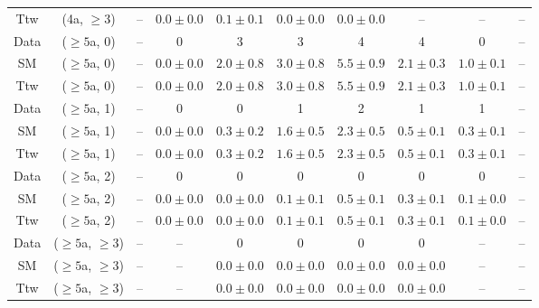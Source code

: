 \begin{table}[h!]
{\begin{tabular}{cccccccccc}
	Ttw & (4a, $\ge3$) & -- & $0.0\pm 0.0$ & $0.1\pm 0.1$ & $0.0\pm 0.0$ & $0.0\pm 0.0$ & -- & -- & -- \\[0.5ex] 
	Data & ($\ge5$a, 0) & -- & 0 & 3 & 3 & 4 & 4 & 0 & -- \\[0.5ex] 
	SM & ($\ge5$a, 0) & -- & $0.0\pm 0.0$ & $2.0\pm 0.8$ & $3.0\pm 0.8$ & $5.5\pm 0.9$ & $2.1\pm 0.3$ & $1.0\pm 0.1$ & -- \\[0.5ex] 
	Ttw & ($\ge5$a, 0) & -- & $0.0\pm 0.0$ & $2.0\pm 0.8$ & $3.0\pm 0.8$ & $5.5\pm 0.9$ & $2.1\pm 0.3$ & $1.0\pm 0.1$ & -- \\[0.5ex] 
	Data & ($\ge5$a, 1) & -- & 0 & 0 & 1 & 2 & 1 & 1 & -- \\[0.5ex] 
	SM & ($\ge5$a, 1) & -- & $0.0\pm 0.0$ & $0.3\pm 0.2$ & $1.6\pm 0.5$ & $2.3\pm 0.5$ & $0.5\pm 0.1$ & $0.3\pm 0.1$ & -- \\[0.5ex] 
	Ttw & ($\ge5$a, 1) & -- & $0.0\pm 0.0$ & $0.3\pm 0.2$ & $1.6\pm 0.5$ & $2.3\pm 0.5$ & $0.5\pm 0.1$ & $0.3\pm 0.1$ & -- \\[0.5ex] 
	Data & ($\ge5$a, 2) & -- & 0 & 0 & 0 & 0 & 0 & 0 & -- \\[0.5ex] 
	SM & ($\ge5$a, 2) & -- & $0.0\pm 0.0$ & $0.0\pm 0.0$ & $0.1\pm 0.1$ & $0.5\pm 0.1$ & $0.3\pm 0.1$ & $0.1\pm 0.0$ & -- \\[0.5ex] 
	Ttw & ($\ge5$a, 2) & -- & $0.0\pm 0.0$ & $0.0\pm 0.0$ & $0.1\pm 0.1$ & $0.5\pm 0.1$ & $0.3\pm 0.1$ & $0.1\pm 0.0$ & -- \\[0.5ex] 
	Data & ($\ge5$a, $\ge3$) & -- & -- & 0 & 0 & 0 & 0 & -- & -- \\[0.5ex] 
	SM & ($\ge5$a, $\ge3$) & -- & -- & $0.0\pm 0.0$ & $0.0\pm 0.0$ & $0.0\pm 0.0$ & $0.0\pm 0.0$ & -- & -- \\[0.5ex] 
	Ttw & ($\ge5$a, $\ge3$) & -- & -- & $0.0\pm 0.0$ & $0.0\pm 0.0$ & $0.0\pm 0.0$ & $0.0\pm 0.0$ & -- & -- \\[0.5ex] 
	\hline
	\hline
\end{tabular}}
\end{table}
